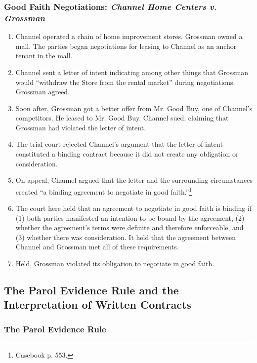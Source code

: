 \subsubsection{Good Faith Negotiations: \emph{Channel Home Centers v. 
Grossman}}

\begin{enumerate}
    \item Channel operated a chain of home improvement stores. Grossman owned 
    a mall. The parties began negotiations for leasing to Channel as an anchor 
    tenant in the mall.
    \item Channel sent a letter of intent indicating among other things that 
    Grossman would ``withdraw the Store from the rental market'' during 
    negotiations. Grossman agreed.
    \item Soon after, Grossman got a better offer from Mr. Good Buy, one of 
    Channel's competitors. He leased to Mr. Good Buy. Channel sued, claiming 
    that Grossman had violated the letter of intent.
    \item The trial court rejected Channel's argument that the letter of 
    intent constituted a binding contract because it did not create any 
    obligation or consideration.
    \item On appeal, Channel argued that the letter and the surrounding 
    circumstances created ``a binding agreement to negotiate in good 
    faith.''\footnote{Casebook p. 553.}
    \item The court here held that an agreement to negotiate in good faith is 
    binding if (1) both parties manifested an intention to be bound by the 
    agreement, (2) whether the agreement's terms were definite and therefore 
    enforceable, and (3) whether there was consideration. It held that the 
    agreement between Channel and Grossman met all of these requirements.
    \item Held, Grossman violated its obligation to negotiate in good faith.
\end{enumerate}

\newpage %

\subsection{The Parol Evidence Rule and the Interpretation of Written 
Contracts}

\subsubsection{The Parol Evidence Rule}

